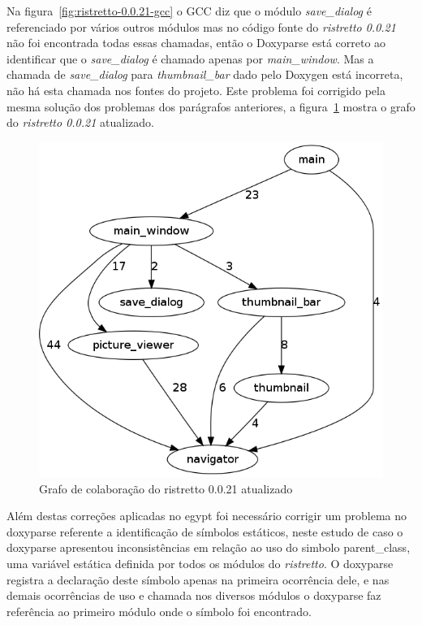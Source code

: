 Na figura~\ref{fig:ristretto-0.0.21-gcc} o GCC diz que o módulo {\it
save\_dialog} é referenciado por vários outros módulos mas no código fonte do
{\it ristretto 0.0.21} não foi encontrada todas essas chamadas, então o
Doxyparse está correto ao identificar que o {\it save\_dialog} é chamado apenas
por {\it main\_window}. Mas a chamada de {\it save\_dialog} para {\it
thumbnail\_bar} dado pelo Doxygen está incorreta, não há esta chamada nos
fontes do projeto. Este problema foi corrigido pela mesma solução dos problemas
dos parágrafos anteriores, a figura~\ref{fig:ristretto-0.0.21-doxyparse-2}
mostra o grafo do {\it ristretto 0.0.21} atualizado.

\begin{figure}
\center
\includegraphics[scale=0.4]{imagens/ristretto-0_0_21-doxyparse-2}
\caption{Grafo de colaboração do ristretto 0.0.21 atualizado}
\label{fig:ristretto-0.0.21-doxyparse-2}
\end{figure}

Além destas correções aplicadas no egypt foi necessário corrigir um problema no
doxyparse referente a identificação de símbolos estáticos, neste estudo de caso
o doxyparse apresentou inconsistências em relação ao uso do simbolo
parent\_class, uma variável estática definida por todos os módulos do {\it
ristretto}. O doxyparse registra a declaração deste símbolo apenas na primeira
ocorrência dele, e nas demais ocorrências de uso e chamada nos diversos módulos o
doxyparse faz referência ao primeiro módulo onde o símbolo foi encontrado.

